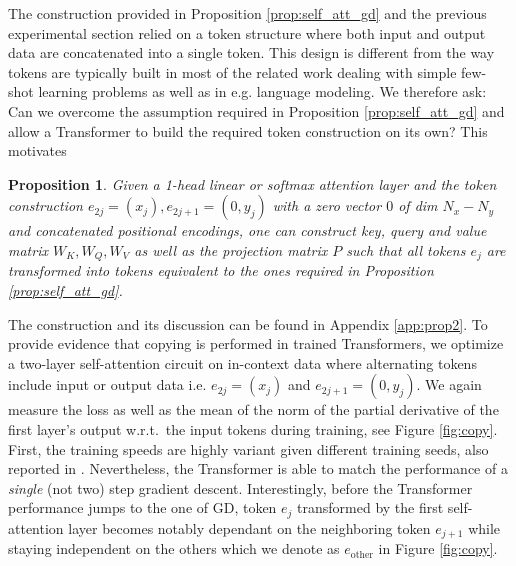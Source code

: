 \documentclass{article}
\newtheorem{prop}{Proposition}
\theoremstyle{plain}
\theoremstyle{definition}
\theoremstyle{remark}
\begin{document}
\label{sect:softmax-builds-tokens}
The construction provided in Proposition \ref{prop:self_att_gd} and the previous experimental section relied on a token structure where both input and output data are concatenated into a single token. This design is different from the way tokens are typically built in most of the related work dealing with simple few-shot learning problems as well as in e.g. language modeling. We therefore ask: Can we overcome the assumption required in Proposition \ref{prop:self_att_gd} and allow a Transformer to build the required token construction on its own? This motivates 
\begin{prop}
\label{prop:token_copy}
Given a 1-head linear or softmax attention layer and the token construction $e_{2j} = (x_j), e_{2j+1} = (0, y_j)$ with a zero vector $0$ of dim $N_x -N_y$ and concatenated positional encodings, one can construct key, query and value matrix $W_K, W_Q, W_V$ as well as the projection matrix $P$ such that all tokens $e_j$ are transformed into tokens equivalent to the ones required in Proposition \ref{prop:self_att_gd}. 
\end{prop}
The construction and its discussion can be found in Appendix \ref{app:prop2}. 
To provide evidence that copying is performed in trained Transformers, we optimize a two-layer self-attention circuit on in-context data where alternating tokens include input or output data i.e. $e_{2j}=(x_j)$ and $e_{2j+1}=(0,y_j)$. We again measure the loss as well as the mean of the norm of the partial derivative of the first layer's output w.r.t.~the input tokens during training, see Figure \ref{fig:copy}. First, the training speeds are highly variant given different training seeds, also reported in \citet{simple_case_study}. Nevertheless, the Transformer is able to match the performance of a \textit{single} (not two) step gradient descent. Interestingly, before the Transformer performance jumps to the one of GD, token $e_j$ transformed by the first self-attention layer becomes notably dependant on the neighboring token $e_{j+1}$ while staying independent on the others which we denote as $e_\text{other}$ in Figure \ref{fig:copy}.
\end{document}
